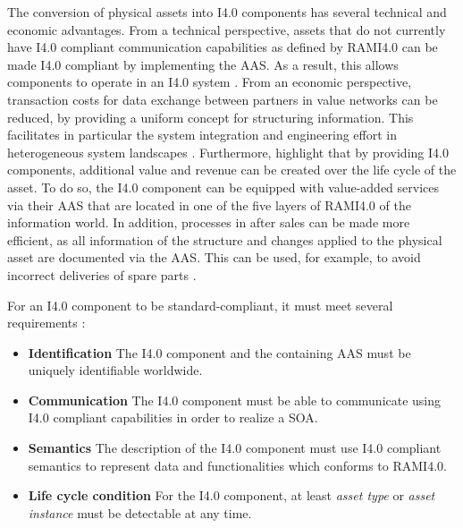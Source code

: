 The conversion of physical assets into \ac{I4.0} components has several technical and economic advantages. From a technical perspective, assets that do not currently have \ac{I4.0} compliant communication capabilities as defined by \ac{RAMI4.0} can be made \ac{I4.0} compliant by implementing the \ac{AAS}. As a result, this allows components to operate in an \ac{I4.0} system \cite[p. 1005]{Birtel2019FutureFit:Approach}. From an economic perspective, transaction costs for data exchange between partners in value networks can be reduced, by providing a uniform concept for structuring information. This facilitates in particular the system integration and engineering effort in heterogeneous system landscapes \cite[p. 324]{Lachenmaier2019entwicklung}. Furthermore,  \citet[p. 325]{Lachenmaier2019entwicklung} highlight that by providing \ac{I4.0} components, additional value and revenue can be created over the life cycle of the asset. To do so, the \ac{I4.0} component can be equipped with value-added services via their \ac{AAS} that are located in one of the five layers of \ac{RAMI4.0} of the information world. In addition, processes in after sales can be made more efficient, as all information of the structure and changes applied to the physical asset are documented via the \ac{AAS}. This can be used, for example, to avoid incorrect deliveries of spare parts \citet[p. 329]{Lachenmaier2019entwicklung}.

For an \ac{I4.0} component to be standard-compliant, it must meet several requirements \cite[p. 1]{Koschnick2015Die4.0-Komponente}:
\begin{itemize}
    \item \textbf{Identification} The \ac{I4.0} component and the containing \ac{AAS} must be uniquely identifiable worldwide.
    \item \textbf{Communication} The \ac{I4.0} component must be able to communicate using \ac{I4.0} compliant capabilities in order to realize a \ac{SOA}.
    \item \textbf{Semantics} The description of the \ac{I4.0} component must use \ac{I4.0} compliant semantics to represent data and functionalities which conforms to \ac{RAMI4.0}.
    \item \textbf{Life cycle condition} For the \ac{I4.0} component, at least \textit{asset type} or \textit{asset instance} must be detectable at any time.
\end{itemize}






